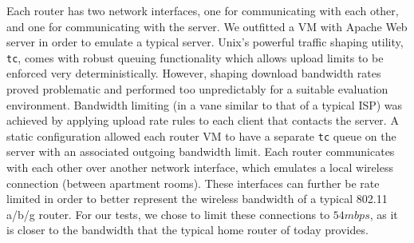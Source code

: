 \documentclass[12pt]{article}
\begin{document}
	Each router has two network interfaces, one for communicating with each other, and one for communicating with the server. We outfitted a VM with Apache Web server in order to emulate a typical server. Unix's powerful traffic shaping utility, \texttt{tc}, comes with robust queuing functionality which allows upload limits to be enforced very deterministically. However, shaping download bandwidth rates proved problematic and performed too unpredictably for a suitable evaluation environment. Bandwidth limiting (in a vane similar to that of a typical ISP) was achieved by applying upload rate rules to each client that contacts the server. A static configuration allowed each router VM to have a separate \texttt{tc} queue on the server with an associated outgoing bandwidth limit. Each router communicates with each other over another network interface, which emulates a local wireless connection (between apartment rooms). These interfaces can further be rate limited in order to better represent the wireless bandwidth of a typical 802.11 a/b/g router. For our tests, we chose to limit these connections to $54 mbps$, as it is closer to the bandwidth that the typical home router of today provides.
\end{document}
